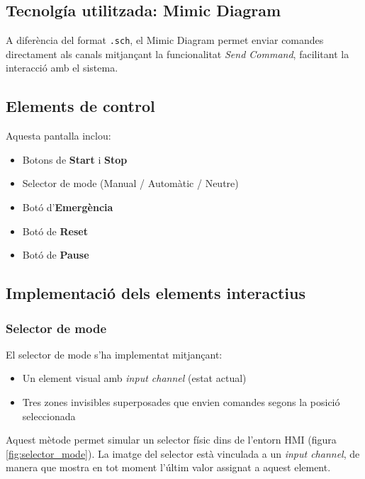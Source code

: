 \documentclass[12pt,a4paper]{report}
\begin{document}
\subsection{Tecnolgía utilitzada: Mimic Diagram}

A diferència del format \texttt{.sch}, el Mimic Diagram \cite{RapidScadaMimicVideo} permet enviar comandes directament als canals mitjançant la funcionalitat \textit{Send Command}, facilitant la interacció amb el sistema.

\subsection{Elements de control}

Aquesta pantalla inclou:

\begin{itemize}
    \item Botons de \textbf{Start} i \textbf{Stop}
    \item Selector de mode (Manual / Automàtic / Neutre)
    \item Botó d'\textbf{Emergència}
    \item Botó de \textbf{Reset}
    \item Botó de \textbf{Pause} 
\end{itemize}

\subsection{Implementació dels elements interactius}
\subsubsection{Selector de mode}

El selector de mode s'ha implementat mitjançant:
\begin{itemize}
    \item Un element visual amb \textit{input channel} (estat actual)
    \item Tres zones invisibles superposades que envien comandes segons la posició seleccionada
\end{itemize}

Aquest mètode permet simular un selector físic dins de l'entorn HMI (figura \ref{fig:selector_mode}). La imatge del selector està vinculada a un \textit{input channel}, de manera que mostra en tot moment l'últim valor assignat a aquest element.
\end{document}
